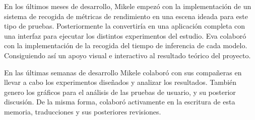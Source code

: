 En los últimos meses de desarrollo, Mikele empezó con la implementación de un sistema de recogida de métricas de rendimiento en una escena ideada para este tipo de pruebas. Posteriormente la convertiría en una aplicación completa con una interfaz para ejecutar los distintos experimentos del estudio. Eva colaboró con la implementación de la recogida del tiempo de inferencia de cada modelo. Consiguiendo así un apoyo visual e interactivo al resultado teórico del proyecto. \newline

En las últimas semanas de desarrollo Mikele colaboró con sus compañeras en llevar a cabo los experimentos diseñados y analizar los resultados. También genero los gráficos para el análisis de las pruebas de usuario, y su posterior discusión. De la misma forma, colaboró activamente en la escritura de esta memoria, traducciones y sus posteriores revisiones.